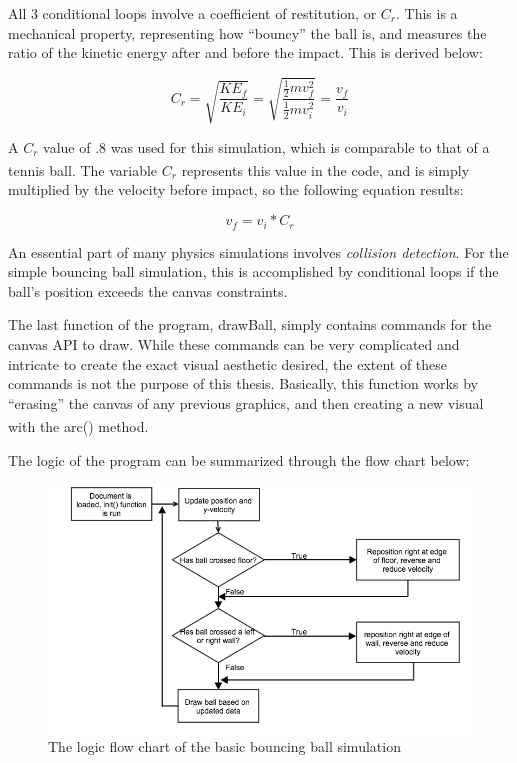 All 3 conditional loops involve a coefficient of restitution, or $C_r$.  This is a mechanical property, representing how ``bouncy'' the ball is, and measures the ratio of the kinetic energy after and before the impact.  This is derived below:

\begin{equation}\label{eq:cr}
C_r = \sqrt{\frac{KE_f}{KE_i}} = \sqrt{\frac{\frac{1}{2} mv_f^2}{\frac{1}{2} mv_i^2}} = \frac{v_f}{v_i}
\end{equation}

A $C_r$ value of .8 was used for this simulation, which is comparable to that of a tennis ball\textsuperscript{\cite{tennisball}}.  The variable $C_r$ represents this value in the code, and is simply multiplied by the velocity before impact, so the following equation results:

\begin{equation}\label{eq:velocitycr}
v_f = v_i * C_r
\end{equation}

An essential part of many physics simulations involves \textit{collision detection}.  For the simple bouncing ball simulation, this is accomplished by conditional loops if the ball's position exceeds the canvas constraints.  


The last function of the program, drawBall, simply contains commands for the canvas API to draw.  While these commands can be very complicated and intricate to create the exact visual aesthetic desired, the extent of these commands is not the purpose of this thesis.  Basically, this function works by ``erasing'' the canvas of any previous graphics, and then creating a new visual with the arc() method.\textsuperscript{\cite{basichtml5}}   

The logic of the program can be summarized through the flow chart below:


\begin{figure}[h] 
	\centering
		\includegraphics[width=15cm]{Figures/basicbouncingball.png}

	\caption{The logic flow chart of the basic bouncing ball simulation}
	\label{fig:basicbouncingball}
\end{figure}




